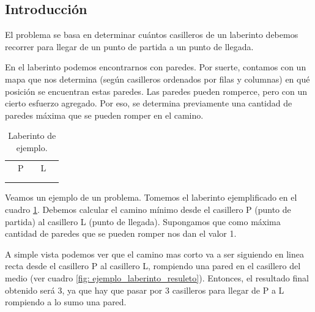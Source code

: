 \subsection{Introducción}

\par El problema se basa en determinar cuántos casilleros de un laberinto debemos recorrer para llegar de un punto de partida a un punto de llegada.
\par En el laberinto podemos encontrarnos con paredes. Por suerte, contamos con un mapa que nos determina (según casilleros ordenados por filas y columnas) en qué posición se encuentran estas paredes. Las paredes pueden romperce, pero con un cierto esfuerzo agregado. Por eso, se determina previamente una cantidad de paredes máxima que se pueden romper en el camino.

\begin{table}[h]
	\centering
	\begin{tabular}{|>{\centering\arraybackslash}p{0.5cm}|>{\centering\arraybackslash}p{0.5cm}|>{\centering\arraybackslash}p{0.5cm}|>{\centering\arraybackslash}p{0.5cm}|>{\centering\arraybackslash}p{0.5cm}|}
		\hline
		\cellcolor{gray} & \cellcolor{gray} & \cellcolor{gray} & \cellcolor{gray} & \cellcolor{gray} \\ \hline
		\cellcolor{gray} & P & \cellcolor{gray} & L & \cellcolor{gray} \\ \hline
		\cellcolor{gray} &  &  &  & \cellcolor{gray} \\ \hline
		\cellcolor{gray} & \cellcolor{gray} & \cellcolor{gray} & \cellcolor{gray} & \cellcolor{gray} \\
		\hline
	\end{tabular}
	\caption{Laberinto de ejemplo.}
	\label{fig: ejemplo_laberinto}
\end{table}

\par Veamos un ejemplo de un problema. Tomemos el laberinto ejemplificado en el cuadro \ref{fig: ejemplo_laberinto}. Debemos calcular el camino mínimo desde el casillero P (punto de partida) al casillero L (punto de llegada). Supongamos que como máxima cantidad de paredes que se pueden romper nos dan el valor 1.
\par A simple vista podemos ver que el camino mas corto va a ser siguiendo en linea recta desde el casillero P al casillero L, rompiendo una pared en el casillero del medio (ver cuadro \ref{fig: ejemplo_laberinto_resuleto}). Entonces, el resultado final obtenido será 3, ya que hay que pasar por 3 casilleros para llegar de P a L rompiendo a lo sumo una pared.

